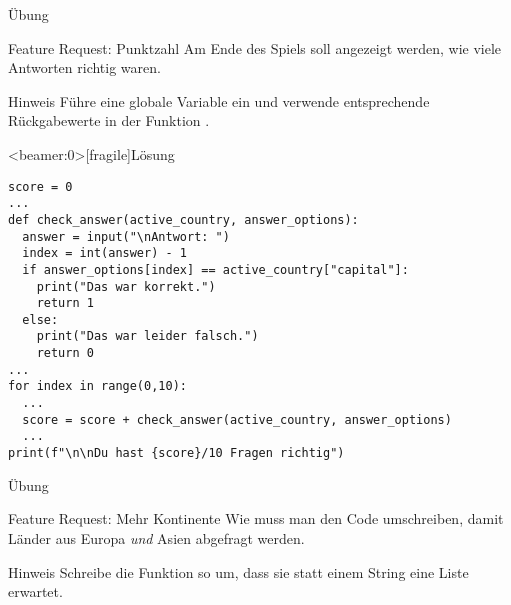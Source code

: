 \begin{frame}{Übung}
\begin{block}{Feature Request: Punktzahl}
\vspace{2pt}
Am Ende des Spiels soll angezeigt werden, wie viele Antworten richtig waren. 
\end{block}

\pause 
\vspace{12pt}
\begin{exampleblock}{Hinweis}
\vspace{2pt}
Führe eine globale Variable  ein und verwende entsprechende Rückgabewerte in der Funktion .	
\end{exampleblock}



\end{frame}

\begin{frame}<beamer:0>[fragile]{Lösung}
	
\begin{solutionblock}{}
\begin{verbatim}
score = 0
...
def check_answer(active_country, answer_options):
  answer = input("\nAntwort: ")
  index = int(answer) - 1
  if answer_options[index] == active_country["capital"]:
    print("Das war korrekt.")
    return 1
  else:
    print("Das war leider falsch.")
    return 0
...
for index in range(0,10): 
  ...
  score = score + check_answer(active_country, answer_options)
  ...
print(f"\n\nDu hast {score}/10 Fragen richtig")
\end{verbatim}
\end{solutionblock}
\end{frame}






\begin{frame}{Übung}
\begin{block}{Feature Request: Mehr Kontinente}
\vspace{2pt}
Wie muss man den Code umschreiben, damit Länder aus Europa \emph{und} Asien abgefragt werden.
\end{block}


\pause

\vspace{12pt}

\begin{exampleblock}{Hinweis}
	\vspace{2pt}
Schreibe die Funktion  so um, dass sie statt einem String  eine Liste  erwartet. 
\end{exampleblock}

\end{frame}

